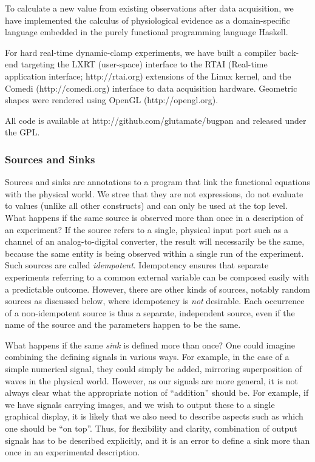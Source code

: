 To calculate a new value from existing observations after data
acquisition, we have implemented the calculus of physiological
evidence as a domain-specific language embedded in the purely functional
programming language Haskell. 

For hard real-time dynamic-clamp experiments, we have built a compiler
back-end targeting the LXRT (user-space) interface to the RTAI (Real-time
application interface; http://rtai.org) extensions of the Linux
kernel, and the Comedi (http://comedi.org) interface to data
acquisition hardware. Geometric shapes were rendered using OpenGL
(http://opengl.org).

All code is available at http://github.com/glutamate/bugpan and
released under the GPL.

\subsubsection*{Sources and Sinks}

Sources and sinks are annotations to a program that link the
functional equations with the physical world. We stree that they are
not expressions, do not evaluate to values (unlike all other
constructs) and can only be used at the top level. What happens if the
same source is observed more than once in a description of an
experiment?  If the source refers to a single, physical input port
such as a channel of an analog-to-digital converter, the result will
necessarily be the same, because the same entity is being observed
within a single run of the experiment. Such sources are called
\emph{idempotent}.  Idempotency ensures that separate experiments
referring to a common external variable can be composed easily with a
predictable outcome. However, there are other kinds of sources,
notably random sources as discussed below, where idempotency is
\emph{not} desirable. Each occurrence of a non-idempotent source is
thus a separate, independent source, even if the name of the source
and the parameters happen to be the same.

What happens if the same \emph{sink} is defined more than once? One could
imagine combining the defining signals in various ways. For example, in the
case of a simple numerical signal, they could simply be added, mirroring
superposition of waves in the physical world. However, as our signals are more
general, it is not always clear what the appropriate notion of ``addition''
should be. For example, if we have signals carrying images, and we wish to
output these to a single graphical display, it is likely that we also need to
describe aspects such as which one should be ``on top''. Thus, for flexibility
and clarity, combination of output signals has to be described explicitly, and
it is an error to define a sink more than once in an experimental description.

